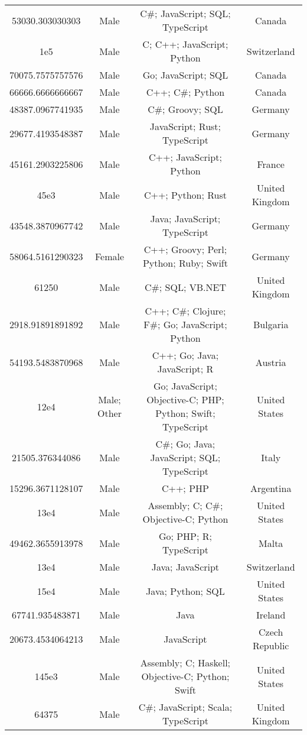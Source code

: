 \begin{center}
\begin{tabular}{ |c|c|c|c| }
53030.303030303  &  Male  &  C\#; JavaScript; SQL; TypeScript  &  Canada  \\ 
1e5  &  Male  &  C; C++; JavaScript; Python  &  Switzerland  \\ 
70075.7575757576  &  Male  &  Go; JavaScript; SQL  &  Canada  \\ 
66666.6666666667  &  Male  &  C++; C\#; Python  &  Canada  \\ 
48387.0967741935  &  Male  &  C\#; Groovy; SQL  &  Germany  \\ 
29677.4193548387  &  Male  &  JavaScript; Rust; TypeScript  &  Germany  \\ 
45161.2903225806  &  Male  &  C++; JavaScript; Python  &  France  \\ 
45e3  &  Male  &  C++; Python; Rust  &  United Kingdom  \\ 
43548.3870967742  &  Male  &  Java; JavaScript; TypeScript  &  Germany  \\ 
58064.5161290323  &  Female  &  C++; Groovy; Perl; Python; Ruby; Swift  &  Germany  \\ 
61250  &  Male  &  C\#; SQL; VB.NET  &  United Kingdom  \\ 
2918.91891891892  &  Male  &  C++; C\#; Clojure; F\#; Go; JavaScript; Python  &  Bulgaria  \\ 
54193.5483870968  &  Male  &  C++; Go; Java; JavaScript; R  &  Austria  \\ 
12e4  &  Male; Other  &  Go; JavaScript; Objective-C; PHP; Python; Swift; TypeScript  &  United States  \\ 
21505.376344086  &  Male  &  C\#; Go; Java; JavaScript; SQL; TypeScript  &  Italy  \\ 
15296.3671128107  &  Male  &  C++; PHP  &  Argentina  \\ 
13e4  &  Male  &  Assembly; C; C\#; Objective-C; Python  &  United States  \\ 
49462.3655913978  &  Male  &  Go; PHP; R; TypeScript  &  Malta  \\ 
13e4  &  Male  &  Java; JavaScript  &  Switzerland  \\ 
15e4  &  Male  &  Java; Python; SQL  &  United States  \\ 
67741.935483871  &  Male  &  Java  &  Ireland  \\ 
20673.4534064213  &  Male  &  JavaScript  &  Czech Republic  \\ 
145e3  &  Male  &  Assembly; C; Haskell; Objective-C; Python; Swift  &  United States  \\ 
64375  &  Male  &  C\#; JavaScript; Scala; TypeScript  &  United Kingdom  \\ 

\end{tabular}
\end{center}
